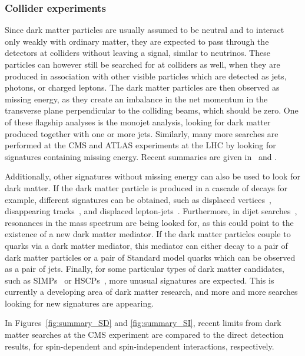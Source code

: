 \subsubsection{Collider experiments}

Since dark matter particles are usually assumed to be neutral and to interact only weakly with ordinary matter, they are expected to pass through the detectors at colliders without leaving a signal, similar to neutrinos. These particles can however still be searched for at colliders as well, when they are produced in association with other visible particles which are detected as jets, photons, or charged leptons. The dark matter particles are then observed as missing energy, as they create an imbalance in the net momentum in the transverse plane perpendicular to the colliding beams, which should be zero. One of these flagship analyses is the monojet analysis, looking for dark matter produced together with one or more jets\cite{Sirunyan:2017hci,Aaboud:2016qgg}. Similarly, many more searches are performed at the \acs{CMS} and \acs{ATLAS} experiments at the \ac{LHC} by looking for signatures containing missing energy. Recent summaries are given in~\cite{Kahlhoefer:2017dnp} and \cite{Buchmueller:2017qhf}.

Additionally, other signatures without missing energy can also be used to look for dark matter. If the dark matter particle is produced in a cascade of decays for example, different signatures can be obtained, such as displaced vertices~\cite{ATLAS:2017bvh}, disappearing tracks~\cite{ATLAS:2017bna}, and displaced lepton-jets~\cite{ATLAS:2017lvz}. Furthermore, in dijet searches~\cite{Sirunyan:2017ygf, Sirunyan:2016iap, Aaboud:2017yvp}, resonances in the mass spectrum are being looked for, as this could point to the existence of a new dark matter mediator. If the dark matter particles couple to quarks via a dark matter mediator, this mediator can either decay to a pair of dark matter particles or a pair of Standard model quarks which can be observed as a pair of jets.  Finally, for some particular types of dark matter candidates, such as \acfp{SIMP}~\cite{Bai:2011wy} or \acp{HSCP}~\cite{CMS:2016ybj,Aaboud:2016dgf}, more unusual signatures are expected. This is currently a developing area of dark matter research, and more and more searches looking for new signatures are appearing.

In Figures~\ref{fig:summary_SD} and \ref{fig:summary_SI}, recent limits from dark matter searches at the \acs{CMS} experiment are compared to the direct detection results, for spin-dependent and spin-independent interactions, respectively.

